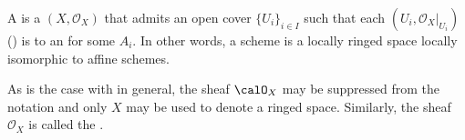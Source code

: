 \begin{definition}[Scheme] \label{definition:scheme}
    A  is a  $(X, \mathcal{O}_X)$ that admits an open cover $\{U_i\}_{i \in I}$ such that each $(U_i, \mathcal{O}_X|_{U_i})$ () is  to an  for some  $A_i$.  
    In other words, a scheme is a locally ringed space locally isomorphic to affine schemes. 
    
    As is the case with  in general, the sheaf $\calO_X$ may be suppressed from the notation and only $X$ may be used to denote a ringed space. Similarly, the sheaf $\mathcal{O}_X$ is called the .
\end{definition}
